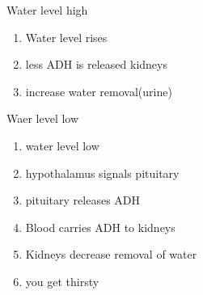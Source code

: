 \documentclass[9pt]{article}
\begin{document}
\begin{enumerate}
  Water level high
  \begin{enumerate}
    \item Water level rises
    \item less ADH is released kidneys
    \item increase water removal(urine)
  \end{enumerate}
Waer level low
\begin{enumerate}
  \item water level low
  \item hypothalamus signals pituitary
  \item pituitary releases ADH
  \item Blood carries ADH to kidneys
  \item Kidneys decrease removal of water
  \item you get thirsty
\end{enumerate}
\end{enumerate}
\end{document}
